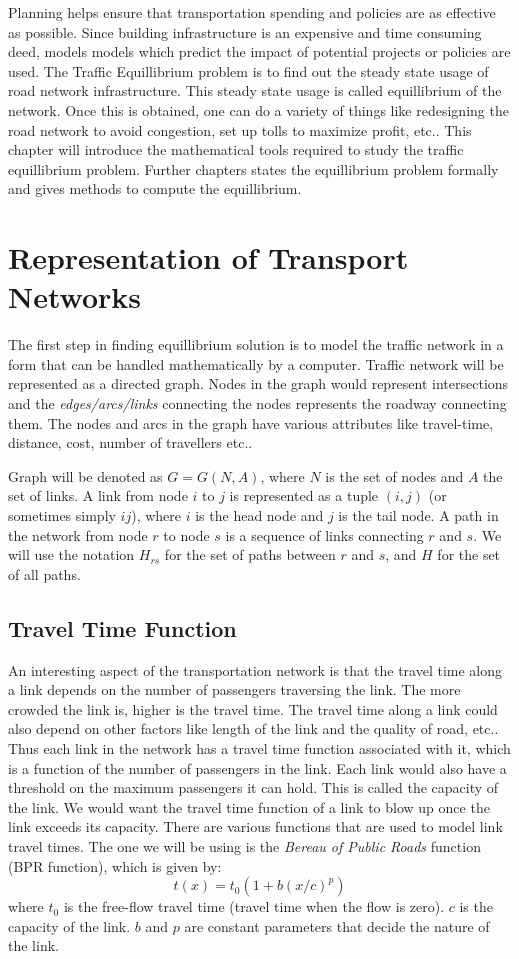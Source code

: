 Planning helps ensure that transportation spending and policies
are as effective as possible. Since building infrastructure
is an expensive and time consuming deed, models
models which predict the impact of potential projects
or policies are used. The Traffic Equillibrium problem
is to find out the steady state usage of road network
infrastructure. This steady state usage is called
equillibrium of the network. Once this is obtained,
one can do a variety of things like redesigning the
road network to avoid congestion, set up tolls
to maximize profit, etc.. This chapter will introduce
the mathematical tools required to study the traffic
equillibrium problem. Further chapters states the equillibrium
problem formally and gives methods to compute the equillibrium.

\section{Representation of Transport Networks}
	The first step in finding equillibrium solution is to
	model the traffic network in a form that can be handled
	mathematically by a computer.
	Traffic network will be represented as a directed graph.
	Nodes in the graph would represent intersections and
	the \emph{edges/arcs/links} connecting the nodes represents
	the roadway connecting them.
	The nodes and arcs in the graph have various attributes
	like travel-time, distance, cost, number of travellers etc..

	Graph will be denoted as $G= G(N,A)$, where $N$ is the
	set of nodes and $A$ the set of links.
	A link from node $i$ to $j$ is represented as a
	tuple $(i,j)$ (or sometimes simply $ij$),
	where $i$ is the head node and
	$j$ is the tail node.
	A path in the network from node $r$ to node $s$
	is a sequence of links connecting $r$ and $s$.
	We will use the notation  $H_{rs}$ for the set of paths between
	$r$ and $s$, and $H$ for the set of all paths.


	\subsection{Travel Time Function}
	An interesting aspect of the transportation network is that
	the travel time along a link depends on the number of
	passengers traversing the link. The more crowded the link
	is, higher is the travel time. The travel time along a
	link could also depend on other factors like length of
	the link and the quality of road, etc.. Thus each link
	in the network has a travel time function associated
	with it, which is a function of the number of passengers in the
	link. Each link would also have a threshold on the maximum
	passengers it can hold. This is called the capacity of the
	link. We would want the travel time function of a link
	to blow up once the link exceeds its capacity. There are
	various functions that are used to model link travel times.
	The one we will be using is the \emph{Bereau of Public Roads}
	function (BPR function), which is given by:
	\[
		t(x) = t_0(1 + b(x/c)^{p})
	\]
	where $t_0$ is the free-flow travel time (travel time when
	the flow is zero). $c$ is the capacity of the link. $b$ and $p$
	are constant parameters that decide the nature of the link.

